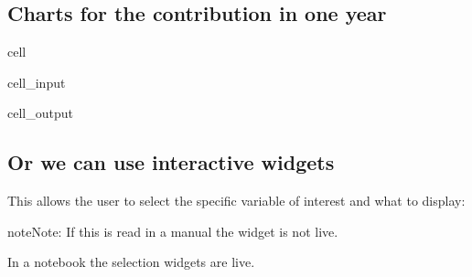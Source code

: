 \documentclass[letterpaper,10pt,english]{jupyterBook}
\begin{document}
\subsection{Charts for the contribution in one year}
\label{\detokenize{content/06_ModelAnalytics/Attribution:charts-for-the-contribution-in-one-year}}
\begin{sphinxuseclass}{cell}\begin{sphinxVerbatimInput}

\begin{sphinxuseclass}{cell_input}
\begin{sphinxVerbatim}[commandchars=\\\{\}]
  

\end{sphinxVerbatim}

\end{sphinxuseclass}\end{sphinxVerbatimInput}
\begin{sphinxVerbatimOutput}

\begin{sphinxuseclass}{cell_output}
\noindent{}

\end{sphinxuseclass}\end{sphinxVerbatimOutput}

\end{sphinxuseclass}

\subsection{Or we can use interactive widgets}
\label{\detokenize{content/06_ModelAnalytics/Attribution:or-we-can-use-interactive-widgets}}
\sphinxAtStartPar
This allows the user to select the specific variable of interest and what to display:

\begin{sphinxadmonition}{note}{Note:}
\sphinxAtStartPar
If this is read in a manual the widget is not live.

\sphinxAtStartPar
In a notebook the selection widgets are live.
\end{sphinxadmonition}
\end{document}
